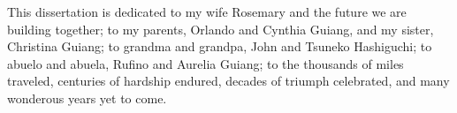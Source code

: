 \begin{dedication}
\setsinglespacing
\parindent0pt\parskip\baselineskip
\begin{center}
This dissertation is dedicated to my wife Rosemary and the future we are building together; 
to my parents, Orlando and Cynthia Guiang, and my sister, Christina Guiang;  
to grandma and grandpa, John and Tsuneko Hashiguchi; 
to abuelo and abuela, Rufino and Aurelia Guiang; 
to the thousands of miles traveled, centuries of hardship endured, decades of triumph celebrated, and many wonderous years yet to come.
\end{center}
\end{dedication}
